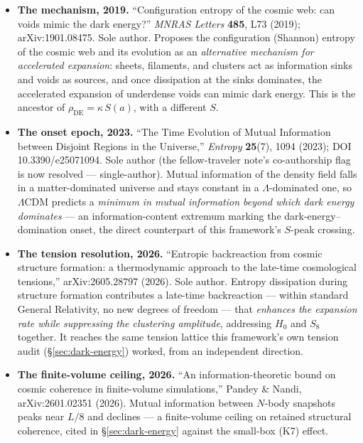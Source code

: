 \documentclass[11pt,a4paper]{article}
\begin{document}
\begin{itemize}[leftmargin=*,itemsep=0.35em]
\item \textbf{The mechanism, 2019.} ``Configuration entropy of the cosmic web: can voids mimic the dark energy?'' \emph{MNRAS Letters} \textbf{485}, L73 (2019); arXiv:1901.08475. Sole author. Proposes the configuration (Shannon) entropy of the cosmic web and its evolution as an \emph{alternative mechanism for accelerated expansion}: sheets, filaments, and clusters act as information sinks and voids as sources, and once dissipation at the sinks dominates, the accelerated expansion of underdense voids can mimic dark energy. This is the ancestor of $\rho_{\text{DE}} = \kappa\,S(a)$, with a different $S$.
\item \textbf{The onset epoch, 2023.} ``The Time Evolution of Mutual Information between Disjoint Regions in the Universe,'' \emph{Entropy} \textbf{25}(7), 1094 (2023); DOI 10.3390/e25071094. Sole author (the fellow-traveler note's co-authorship flag is now resolved --- single-author). Mutual information of the density field falls in a matter-dominated universe and stays constant in a $\Lambda$-dominated one, so $\Lambda$CDM predicts a \emph{minimum in mutual information beyond which dark energy dominates} --- an information-content extremum marking the dark-energy--domination onset, the direct counterpart of this framework's $S$-peak crossing.
\item \textbf{The tension resolution, 2026.} ``Entropic backreaction from cosmic structure formation: a thermodynamic approach to the late-time cosmological tensions,'' arXiv:2605.28797 (2026). Sole author. Entropy dissipation during structure formation contributes a late-time backreaction --- within standard General Relativity, no new degrees of freedom --- that \emph{enhances the expansion rate while suppressing the clustering amplitude}, addressing $H_0$ and $S_8$ together. It reaches the same tension lattice this framework's own tension audit (\S\ref{sec:dark-energy}) worked, from an independent direction.
\item \textbf{The finite-volume ceiling, 2026.} ``An information-theoretic bound on cosmic coherence in finite-volume simulations,'' Pandey \& Nandi, arXiv:2601.02351 (2026). Mutual information between $N$-body snapshots peaks near $L/8$ and declines --- a finite-volume ceiling on retained structural coherence, cited in \S\ref{sec:dark-energy} against the small-box (K7) effect.
\end{itemize}
\end{document}
